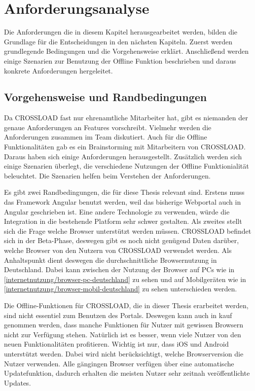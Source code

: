 \chapter{Anforderungsanalyse}
\label{Kap3}
Die Anforderungen die in diesem Kapitel herausgearbeitet werden, bilden die Grundlage für die Entscheidungen in den nächsten Kapiteln. Zuerst werden grundlegende Bedingungen und die Vorgehensweise erklärt. Anschließend werden einige Szenarien zur Benutzung der Offline Funktion beschrieben und daraus konkrete Anforderungen hergeleitet.

\section{Vorgehensweise und Randbedingungen}
Da CROSSLOAD fast nur ehrenamtliche Mitarbeiter hat, gibt es niemanden der genaue Anforderungen an Features vorschreibt. Vielmehr werden die Anforderungen zusammen im Team diskutiert. Auch für die Offline Funktionalitäten gab es ein Brainstorming mit Mitarbeitern von CROSSLOAD. Daraus haben sich einige Anforderungen herausgestellt. Zusätzlich werden sich einige Szenarien überlegt, die verschiedene Nutzungen der Offline Funktionialität beleuchtet. Die Szenarien helfen beim Verstehen der Anforderungen.

Es gibt zwei Randbedingungen, die für diese Thesis relevant sind. Erstens muss das Framework Angular benutzt werden, weil das bisherige Webportal auch in Angular geschrieben ist. Eine andere Technologie zu verwenden, würde die Integration in die bestehende Platform sehr schwer gestalten. Als zweites stellt sich die Frage welche Browser unterstützt werden müssen. CROSSLOAD befindet sich in der Beta-Phase, deswegen gibt es noch nicht genügend Daten darüber, welche Browser von den Nutzern von CROSSLOAD verwendet werden. Als Anhaltspunkt dient deswegen die durchschnittliche Browsernutzung in Deutschland. Dabei kann zwischen der Nutzung der Browser auf PCs wie in \autoref{internetnutzung/browser-pc-deutschland} zu sehen und auf Mobilgeräten wie in \autoref{internetnutzung/browser-mobil-deutschland} zu sehen unterschieden werden.



Die Offline-Funktionen für CROSSLOAD, die in dieser Thesis erarbeitet werden, sind nicht essentiel zum Benutzen des Portals. Deswegen kann auch in kauf genommen werden, dass manche Funktionen für Nutzer mit gewissen Browsern nicht zur Verfügung stehen. Natürlich ist es besser, wenn viele Nutzer von den neuen Funktionalitäten profitieren. Wichtig ist nur, dass iOS und Android unterstützt werden. Dabei wird nicht berücksichtigt, welche Browserversion die Nutzer verwenden. Alle gängingen Browser verfügen über eine automatische Updatefunktion, dadurch erhalten die meisten Nutzer sehr zeitnah veröffentlichte Updates.


